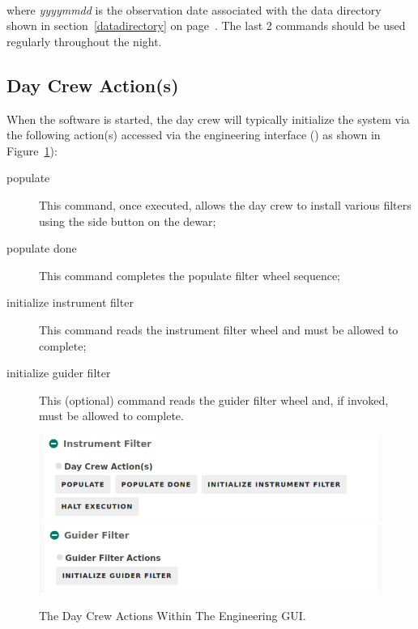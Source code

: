 \documentclass[12pt,twoside]{article}
\begin{document}



 \\

\noindent where \emph{yyyymmdd} is the observation date associated with the data directory shown in section~\ref{datadirectory} on page~\pageref{datadirectory}. The last 2 commands should be used regularly throughout the night.

\subsection{Day Crew Action(s)}
\label{daycrewactions}

\noindent When the software is started, the day crew will typically initialize the system via the following action(s)
accessed via the engineering interface () as shown in Figure~\ref{engineer}):

\begin{description}
 \item[{\sc populate}] This command, once executed, allows the day crew to install various filters using the side 
                       button on the dewar;
 \item[{\sc populate done}] This command completes the populate filter wheel sequence;
 \item[{\sc initialize instrument filter}] This command reads the instrument filter wheel and must be allowed to complete;
 \item[{\sc initialize guider filter}] This (optional) command reads the guider filter wheel and, if invoked, must be allowed 
                                       to complete.
\end{description}

\begin{figure}[!h]
 \centering
 \includegraphics[width=0.5\linewidth]{DayCrewActions1.png}
 \includegraphics[width=0.5\linewidth]{DayCrewActions2.png}
 \caption{The Day Crew Actions Within The Engineering GUI.}
 \label{engineer}
\end{figure}
\end{document}
